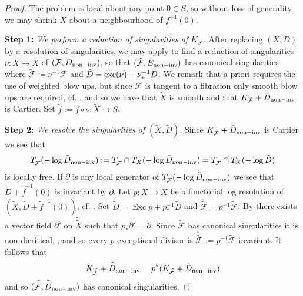 \documentclass[12pt, a4paper]{amsart}
\DeclareMathOperator{\exc}{Exc}
\newcounter{Theorem}
\theoremstyle{definition}
\theoremstyle{named}
\begin{document}
\begin{proof}
The problem is local about any point $0 \in S$, so without loss of generality we may shrink $X$
about a neighbourhood of $f^{-1}(0)$.

{\bf Step 1: }{\it We perform a reduction of singularities of $K_{\mathcal F}$.}
After replacing $(X, D)$ by a resolution of singularities, we may apply \cite[III.iii.4.bis]{MP13} to find a reduction of singularities $\nu\colon \tilde{X} \rightarrow X$ of 
$(\mathcal F, D_{{\rm non-inv}})$, 
so that $(\tilde{\mathcal F}, E_{{\rm non-inv}})$ has canonical singularities where 
$\tilde{\mathcal F} \coloneqq \nu^{-1}\mathcal F$ and 
$\tilde{D} = {\rm exc}(\nu)+\nu_*^{-1}D$.
We remark that a priori \cite{MP13} requires the use of weighted blow ups, 
but since $\mathcal F$ is tangent to a fibration only smooth blow ups are required, cf. \cite{CR14}, and so 
we have that $\tilde{X}$ is smooth and that $K_{\tilde{\mathcal F}}+\tilde{D}_{{\rm non-inv}}$ is Cartier.
Set $\tilde{f}:= f \circ \nu \colon \tilde{X} \to S$.


{\bf Step 2: }{\it  We resolve the singularities of $(\tilde{X}, \tilde{D})$.}
Since $K_{\tilde{\mathcal F}}+\tilde{D}_{{\rm non-inv}}$ is Cartier we see that \begin{align*}T_{\tilde{\mathcal F}}(-\log \tilde{D}_{{\rm non-inv}}) := T_{\tilde{\mathcal F}} \cap T_X(-\log \tilde{D}_{{\rm non-inv}}) = T_{\tilde{\mathcal F}} \cap T_X(-\log \tilde{D})\end{align*}
is locally free.  
If $\partial$ is any local generator of $T_{\tilde{\mathcal F}}(-\log \tilde{D}_{{\rm non-inv}})$ we see that $\tilde{D}+\tilde{f}^{-1}(0)$ is invariant by $\partial$.  
 Let $p\colon \tilde{\tilde{X}} \rightarrow \tilde{X}$ be a functorial log resolution of $(\tilde{X}, \tilde{D}+\tilde{f}^{-1}(0))$, cf. \cite[ Theorems 3.35 and 3.45]{kollar07b}.  Set $\tilde{\tilde{D}} = \exc p+ p_*^{-1}\tilde{D}$ and $\tilde{\tilde{\mathcal F}} = p^{-1}\tilde{\mathcal F}$. By \cite[Corollary 4.7]{MR2581247} there exists a vector field 
$\partial'$ on $\tilde{\tilde{X}}$ such that $p_*\partial' = \partial$.
Since $\tilde{\mathcal F}$ has canonical singularities it is non-dicritical, \cite[Corollary III.i.4]{MP13}, and so every $p$-exceptional divisor is $\tilde{\tilde{\mathcal F}}:=p^{-1}\tilde{\mathcal F}$ invariant.  It follows that 
\begin{align*}K_{\tilde{\tilde{\mathcal F}}}+\tilde{\tilde{D}}_{{\rm non-inv}} = 
p^*(K_{\tilde{\mathcal F}}+\tilde{D}_{{\rm non-inv}})\end{align*}
and so $(\tilde{\tilde{\mathcal F}},  \tilde{\tilde{D}}_{{\rm non-inv}})$ 
has canonical singularities.



\end{proof}
\end{document}
